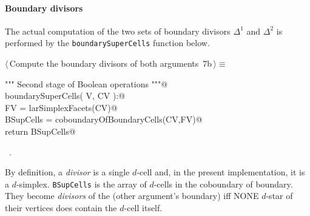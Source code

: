 \documentclass[11pt,oneside]{article}	%
\begin{document}
\paragraph{Boundary divisors}
The actual computation of the two sets of boundary divisors $\Delta^1$ and $\Delta^2$ is performed by the \texttt{boundarySuperCells} function below.

\begin{flushleft} \small \label{scrap13}
\protect{}$\langle\,$Compute the boundary divisors of both arguments\nobreak\ {\footnotesize 7b}$\,\rangle\equiv$
\vspace{-1ex}
\begin{list}{}{} \item
\mbox{}\verb@""" Second stage of Boolean operations """@\\
\mbox{}\verb@def boundarySuperCells( V, CV ):@\\
\mbox{}\verb@   FV = larSimplexFacets(CV)@\\
\mbox{}\verb@   BSupCells = coboundaryOfBoundaryCells(CV,FV)@\\
\mbox{}\verb@   return BSupCells@\\
\mbox{}\verb@@{\NWsep}
\end{list}
\vspace{-1ex}
\footnotesize\addtolength{\baselineskip}{-1ex}
\begin{list}{}{\setlength{\itemsep}{-\parsep}\setlength{\itemindent}{-\leftmargin}}
\item \NWtxtMacroRefIn\ .
\end{list}
\end{flushleft}


By definition, a \emph{divisor} is a single $d$-cell and, in the present implementation, it is a $d$-simplex. \texttt{BSupCells} is the array of $d$-cells in the coboundary of boundary. They become \emph{divisors} of the (other argument's boundary) iff NONE $d$-star of their vertices does contain the $d$-cell itself.
\end{document}

